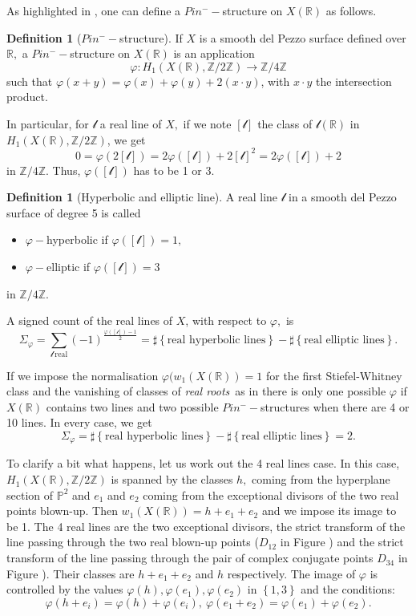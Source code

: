 \documentclass{amsart}
\theoremstyle{plain}%
\theoremstyle{remark}
\theoremstyle{definition}
\newtheorem{defintro}[subsection]{Definition}
\newcommand{\cml}{\mathcal l}
\newcommand{\eP}{\mathbb{P}}
\newcommand{\eR}{\mathbb{R}}
\newcommand{\eZ}{\mathbb{Z}}
\newcommand{\accol}[1]{\left\{#1\right\}}
\begin{document}
As highlighted in \cite[Section 2.4]{FK_real-lines}, one can define a $Pin^- -$structure on $X(\eR)$ as follows.
\begin{defintro}[$Pin^- -$structure]\label{DEF - pin structure}
If $X$ is a smooth del Pezzo surface defined over $\eR,$ a $Pin^- -$structure on $X(\eR)$ is an application 
\[\varphi : H_1(X(\eR),\eZ/2\eZ) \to \eZ/4\eZ\]
such that $\varphi(x+y) = \varphi(x) + \varphi(y) +2(x\cdot y)$, with $x\cdot y$ the intersection product.
\end{defintro}
In particular, for $\cml$ a real line of $X,$ if we note $[\cml]$ the class of $\cml(\eR)$ in $H_1(X(\eR),\eZ/2\eZ)$, we get
\[0 = \varphi(2[\cml]) = 2\varphi([\cml]) + 2 [\cml]^2 = 2\varphi([\cml]) + 2 \]
in $\eZ/4\eZ.$ Thus, $\varphi([\cml])$ has to be 1 or 3.
\begin{defintro}[Hyperbolic and elliptic line]\label{DEF - hyperbolic and elliptic line}
A real line $\cml$ in a smooth del Pezzo surface of degree 5 is called
\begin{itemize}
    \item $\varphi-$hyperbolic if $\varphi([\cml]) = 1,$
    \item $\varphi-$elliptic if $\varphi([\cml]) = 3$
\end{itemize}
in $\eZ/4\eZ.$
\end{defintro}
A signed count of the real lines of $X$, with respect to $\varphi,$ is
\[\Sigma_\varphi = \sum_{\cml\  \text{real}} (-1)^{\frac{\varphi([\cml])-1}{2}} = \sharp \accol{\text{real hyperbolic lines}} - \sharp \accol{\text{real elliptic lines}}.\]

If we impose the normalisation $\varphi(w_1(X(\eR)) = 1$ for the first Stiefel-Whitney class and the vanishing of classes of \emph{real roots}\ as in \cite{FK_real-lines} there is only one possible $\varphi$ if $X(\eR)$ contains two lines and two possible $Pin^- -$structures when there are 4 or 10 lines. In every case, we get 
\[\Sigma_\varphi = \sharp \accol{\text{real hyperbolic lines}} - \sharp \accol{\text{real elliptic lines}} = 2.\]

To clarify a bit what happens, let us work out the 4 real lines case. In this case, $H_1(X(\eR),\eZ/2\eZ)$ is spanned by the classes $h,$ coming from the hyperplane section of $\eP^2$ and $e_1$ and $e_2$ coming from the exceptional divisors of the two real points blown-up. Then $w_1(X(\eR)) = h + e_1 +e_2$ and we impose its image to be 1. The 4 real lines are the two exceptional divisors, the strict transform of the line passing through the two real blown-up points ($D_{12}$ in Figure ) and the strict transform of the line passing through the pair of complex conjugate points $D_{34}$ in Figure ). Their classes are $h+e_1 +e_2$ and $h$ respectively. The image of $\varphi$ is controlled by the values $\varphi(h),\varphi(e_1),\varphi(e_2)$ in $\accol{1,3}$ and the conditions:
\[\varphi(h+e_i) = \varphi(h)+\varphi(e_i),\ \varphi(e_1+e_2) = \varphi(e_1)+\varphi(e_2).\]
\end{document}
